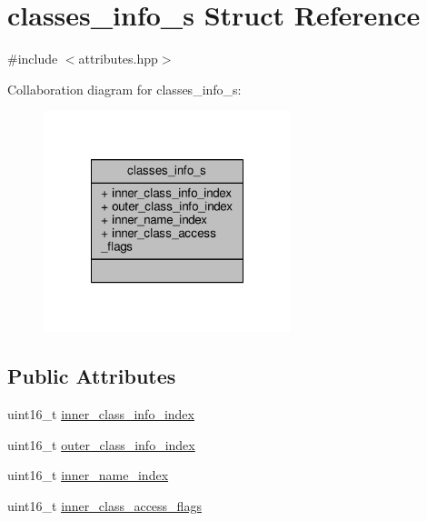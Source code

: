\hypertarget{structclasses__info__s}{\section{classes\+\_\+info\+\_\+s Struct Reference}
\label{structclasses__info__s}
}


{\ttfamily \#include $<$attributes.\+hpp$>$}



Collaboration diagram for classes\+\_\+info\+\_\+s\+:\nopagebreak
\begin{figure}[H]
\begin{center}
\leavevmode
\includegraphics[width=204pt]{structclasses__info__s__coll__graph}
\end{center}
\end{figure}
\subsection*{Public Attributes}
\begin{DoxyCompactItemize}
\item 
uint16\+\_\+t \hyperlink{structclasses__info__s_ae8c45ace1c34dd137289f54f5d5704c3}{inner\+\_\+class\+\_\+info\+\_\+index}
\item 
uint16\+\_\+t \hyperlink{structclasses__info__s_a25b561f15295b3ea0d55932ee4f00260}{outer\+\_\+class\+\_\+info\+\_\+index}
\item 
uint16\+\_\+t \hyperlink{structclasses__info__s_ac33145154cb1f0db33d90e02800b00bb}{inner\+\_\+name\+\_\+index}
\item 
uint16\+\_\+t \hyperlink{structclasses__info__s_a821ed8a4eabdf77102409c67bb0d519f}{inner\+\_\+class\+\_\+access\+\_\+flags}
\end{DoxyCompactItemize}


